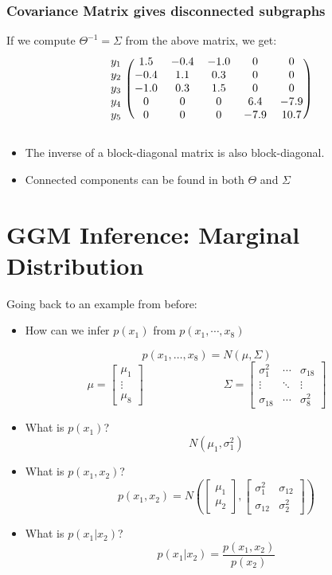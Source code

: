 \documentclass[10pt]{article}
\begin{document}
\subsubsection*{Covariance Matrix gives disconnected subgraphs}
If we compute $\Theta^{-1} = \Sigma$ from the above matrix, we get:
\[\begin{blockarray}{cccccc}
    \begin{block}{c(ccccc)}
    y_1 & 1.5 & -0.4 & -1.0 & 0 & 0 \\
    y_2 & -0.4 & 1.1 & 0.3 & 0 & 0 \\
    y_3 & -1.0 & 0.3 & 1.5 & 0 & 0 \\
    y_4 & 0 & 0 & 0 & 6.4 & -7.9 \\
    y_5 & 0 & 0 & 0 & -7.9 & 10.7 \\
    \end{block}
    \end{blockarray}
\]
\begin{itemize}
	\item The inverse of a block-diagonal matrix is also block-diagonal.
	\item Connected components can be found in both $\Theta$ and $\Sigma$
\end{itemize}

\section*{GGM Inference: Marginal Distribution}
Going back to an example from before:
\begin{itemize}
	\item How can we infer $p(x_1)$ from $p(x_1, \cdots, x_8)$
\end{itemize}
\[p(x_1, \dots, x_8) = N(\mu, \Sigma)\]
\[\mu = \begin{bmatrix} \mu_1 \\ \vdots \\ \mu_8 \end{bmatrix} \hspace{3cm} \Sigma = \begin{bmatrix} \sigma_{1}^2 & \cdots & \sigma_{18} \\ \vdots & \ddots & \vdots \\ \sigma_{18} & \cdots & \sigma_{8}^2 \end{bmatrix}\]
\begin{itemize}
	\item What is $p(x_1)$? 
	\[N(\mu_1, \sigma_1^2)\]
	\item What is $p(x_1, x_2)$?
	\[p(x_1, x_2) = N\left(\begin{bmatrix} \mu_1 \\ \mu_2 \end{bmatrix}, \begin{bmatrix} \sigma_1^2 & \sigma_{12} \\ \sigma_{12} & \sigma_2^2 \end{bmatrix}\right)\]
    \item What is $p(x_1 | x_2)$?
    \[p(x_1 | x_2) = \frac{p(x_1, x_2)}{p(x_2)}\]
\end{itemize}
\end{document}
